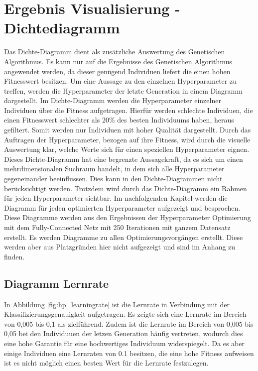 \section{Ergebnis Visualisierung - Dichtediagramm} \label{ssec:Visualisierung}
Das Dichte-Diagramm dient als zusätzliche Auswertung des Genetischen Algorithmus. Es kann nur auf die Ergebnisse des Genetischen Algorithmus angewendet werden, da dieser genügend Individuen liefert die einen hohen Fitnesswert besitzen. Um eine Aussage zu den einzelnen Hyperparameter zu treffen, werden die Hyperparameter der letzte Generation in einem Diagramm dargestellt. Im Dichte-Diagramm werden die Hyperparameter einzelner Individuen über die Fitness aufgetragen. Hierfür werden schlechte Individuen, die einen Fitnesswert schlechter als 20\% des besten Individuums haben, heraus gefiltert. Somit werden nur Individuen mit hoher Qualität dargestellt. Durch das Auftragen der Hyperparameter, bezogen auf ihre Fitness, wird durch die visuelle Auswertung klar, welche Werte sich für einen speziellen Hyperparameter eignen. Dieses Dichte-Diagramm hat eine begrenzte Aussagekraft, da es sich um einen mehrdimensionalen Suchraum handelt, in dem sich alle Hyperparameter gegeneinander beeinflussen. Dies kann in den Dichte-Diagrammen nicht berücksichtigt werden. Trotzdem wird durch das Dichte-Diagramm ein Rahmen für jeden Hyperparameter sichtbar. Im nachfolgenden Kapitel werden die Diagramm für jeden optimierten Hyperparameter aufgezeigt und besprochen. Diese Diagramme werden aus den Ergebnissen der Hyperparameter Optimierung mit dem Fully-Connected Netz mit 250 Iterationen mit ganzem Datensatz erstellt. Es werden Diagramme zu allen Optimierungsvorgängen erstellt. Diese werden aber aus Platzgründen hier nicht aufgezeigt und sind im Anhang zu finden.
 
\newpage

\subsection{Diagramm Lernrate}
In Abbildung \ref{fig:hp_learningrate} ist die Lernrate in Verbindung mit der Klassifizierungsgenauigkeit aufgetragen. Es zeigte sich eine Lernrate im Bereich von 0,005 bis 0,1 als zielführend. Zudem ist die Lernrate im Bereich von 0,005 bis 0,05 bei den Individuuen der letzen Generation häufig vertreten, wodurch dies eine hohe Garantie für eine hochwertiges Individuum widerspiegelt. Da es aber einige Individuen eine Lernraten von 0.1 besitzen, die eine hohe Fitness aufweisen ist es nicht möglich einen besten Wert für die Lernrate festzulegen.

